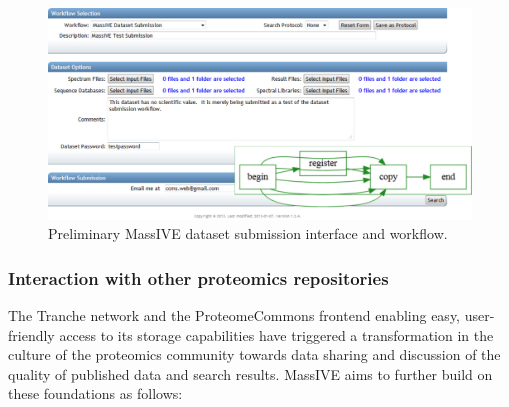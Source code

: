 \documentclass[arial,11pt]{article}
\begin{document}
\begin{figure}[ht]
  \centering
  \includegraphics[width=\textwidth]{figures/MassIVE_submission.pdf}
  \caption{\footnotesize Preliminary MassIVE dataset submission interface and workflow.}
  \label{trd.software.fig.massiveSubmission}
\end{figure}

\subsubsection{Interaction with other proteomics repositories}

The Tranche network and the ProteomeCommons frontend enabling easy, user-friendly access to its storage capabilities have triggered a transformation in the culture of the proteomics community towards data sharing and discussion of the quality of published data and search results. MassIVE aims to further build on these foundations as follows:
\end{document}
